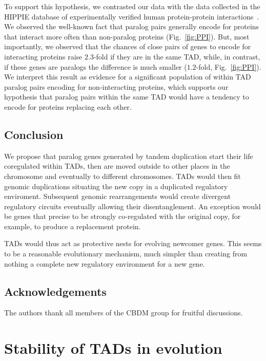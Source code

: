 \documentclass[a4paper,twoside=true,openright,parskip=full,chapterprefix=true,11pt,headings=normal,bibliography=totoc,listof=totoc,titlepage=on,captions=tableabove,draft=false]{scrreprt}
\theoremstyle{definition}
\theoremstyle{definition}
\theoremstyle{definition}
\theoremstyle{remark}
\begin{document}
To support this hypothesis, we contrasted our data with the data
collected in the HIPPIE database of experimentally verified human
protein-protein interactions~\citep{Schaefer2012}. We observed the
well-known fact that paralog pairs generally encode for proteins that
interact more often than non-paralog proteins (Fig.~\ref{fig:PPI}). But,
most importantly, we observed that the chances of close pairs of genes
to encode for interacting proteins raise \(2.3\)-fold if they are in the
same TAD, while, in contrast, if these genes are paralogs the difference
is much smaller (\(1.2\)-fold, Fig.~\ref{fig:PPI}). We interpret this
result as evidence for a significant population of within TAD paralog
pairs encoding for non-interacting proteins, which supports our
hypothesis that paralog pairs within the same TAD would have a tendency
to encode for proteins replacing each other.

\hypertarget{conclusion}{%
\section{Conclusion}\label{conclusion}}

We propose that paralog genes generated by tandem duplication start
their life coregulated within TADs, then are moved outside to other
places in the chromosome and eventually to different chromosomes. TADs
would then fit genomic duplications situating the new copy in a
duplicated regulatory enviroment. Subsequent genomic rearrangements
would create divergent regulatory circuits eventually allowing their
disentanglement. An exception would be genes that precise to be strongly
co-regulated with the original copy, for example, to produce a
replacement protein.

TADs would thus act as protective nests for evolving newcomer genes.
This seems to be a reasonable evolutionary mechanism, much simpler than
creating from nothing a complete new regulatory environment for a new
gene.

\hypertarget{acknowledgements}{%
\section{Acknowledgements}\label{acknowledgements}}

The authors thank all members of the CBDM group for fruitful
discussions.

\hypertarget{TAD-evolution}{%
\chapter{Stability of TADs in evolution}\label{TAD-evolution}}
\end{document}

